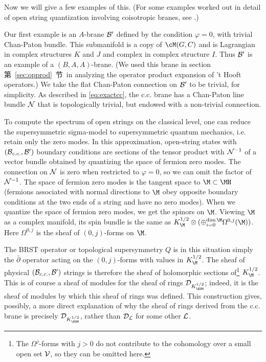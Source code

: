 Now we will give a few examples of this. (For some examples worked
out in detail of open string quantization involving coisotropic
branes, see \cite{ref144}.)

Our first example is an $A$-brane ${\cal B}'$ defined by the
condition $\varphi=0$, with trivial Chan-Paton bundle. This
submanifold is a copy of $\cM(G,C)$ and is Lagrangian in complex
structures $K$ and $J$ and complex in complex structure $I$. Thus
${\cal B}'$ is an example of a $(B,A,A)$-brane. (We used this
brane in section 第~\ref{sec:opprod}~节\ in analyzing the operator product
expansion of 't Hooft operators.) We take the flat Chan-Paton
connection on ${\cal B}'$ to be trivial, for simplicity. As
described in \eqref{eq:exactcc}, the c.c. brane has a Chan-Paton line bundle
${\cal N}$ that is topologically trivial, but endowed with a
non-trivial connection.

To compute the spectrum of open strings on the classical level,
one can reduce the supersymmetric sigma-model to supersymmetric
quantum mechanics, i.e. retain only the zero modes. In this
approximation, open-string states with $({\cal B}_{c.c.},{\cal
B}')$ boundary conditions are sections of the tensor product with
${\cal N}^{-1}$ of a vector bundle obtained by quantizing the
space of fermion zero modes. The connection on ${\cal N}$ is zero
when restricted to $\varphi=0$, so we can omit the factor of
${\cal N}^{-1}$. The space of fermion zero modes is the tangent
space to $\M\subset \MH$ (fermions associated with normal
directions to $\M$ obey opposite boundary conditions at the two
ends of a string and have no zero modes). When we quantize the
space of fermion zero modes, we get the spinors on $\M$. Viewing
$\M$ as a complex manifold, its spin bundle is the same as
$K_\M^{1/2}\otimes(\oplus_{i=0}^{{\rm dim}\,\M}\Omega^{0,j}(\M))$.
Here $\Omega^{0,j}$ is the sheaf of $(0,j)$-forms on $\M$.

The BRST operator or topological supersymmetry $Q$ is in this
situation simply the $\bar\partial$ operator acting on the
$(0,j)$-forms with values in $K_\M^{1/2}$.  The sheaf of physical
 $({\cal B}_{c.c.},{\cal B}')$ strings is therefore the sheaf of
 holomorphic
sections of\footnote{The $\Omega^j$-forms with $j>0$ do not contribute
to the cohomology over a small open set ${{\cal V}}$, so they can
be omitted here.} $K_\M^{1/2}$. This is of course a sheaf of
modules for the sheaf of rings ${\cal D}_{K_{ \EUM}^{1/2}}$;
indeed, it is the sheaf of modules by which this sheaf of rings
was defined. This construction gives, possibly, a more direct
explanation of why the sheaf of rings derived from the c.c. brane
is precisely ${\cal D}_{K_{ \EUM}^{1/2}}$, rather than ${\cal
D}_{\cal L}$ for some other ${\cal L}$.

